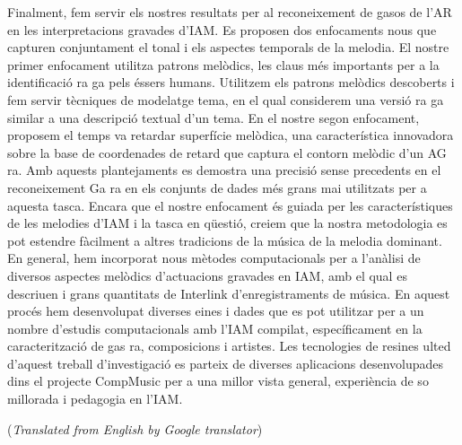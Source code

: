 Finalment, fem servir els nostres resultats per al reconeixement de gasos de l'AR en les interpretacions gravades d'IAM. Es proposen dos enfocaments nous que capturen conjuntament el tonal i els aspectes temporals de la melodia. El nostre primer enfocament utilitza patrons melòdics, les claus més importants per a la identificació ra ga pels éssers humans. Utilitzem els patrons melòdics descoberts i fem servir tècniques de modelatge tema, en el qual considerem una versió ra ga similar a una
descripció textual d'un tema. En el nostre segon enfocament, proposem el temps va retardar superfície melòdica, una característica innovadora sobre la base de coordenades de retard que captura el contorn melòdic d'un AG ra. Amb aquests plantejaments es demostra una precisió sense precedents en el reconeixement Ga ra en els conjunts de dades més grans mai utilitzats per a aquesta tasca. Encara que el nostre enfocament és guiada per les característiques de les melodies d'IAM i la tasca en qüestió, creiem que la nostra metodologia es pot estendre fàcilment a altres tradicions de la música de la melodia dominant.
En general, hem incorporat nous mètodes computacionals per a l'anàlisi de diversos aspectes melòdics d'actuacions gravades en IAM, amb el qual es descriuen i grans quantitats de Interlink d'enregistraments de música. En aquest procés hem desenvolupat diverses eines i dades que es pot utilitzar per a un nombre d'estudis computacionals amb l'IAM compilat, específicament en la caracterització de gas ra, composicions i artistes. Les tecnologies de resines ulted d'aquest treball d'investigació es parteix de diverses aplicacions desenvolupades dins el projecte CompMusic per a una millor vista general, experiència de so millorada i pedagogia en l'IAM.


\vfill
{\noindent (\emph{Translated from English by Google translator})}